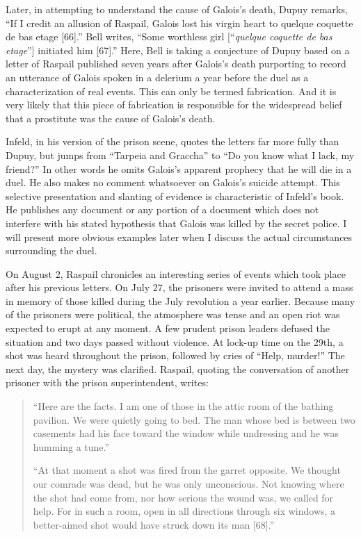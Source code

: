 \documentclass[12pt]{article}
\begin{document}
Later, in attempting to understand the cause of Galois's death, Dupuy remarks, ``If I credit an allusion of Raspail, Galois lost his virgin heart to quelque coquette de bas etage [66].'' Bell writes, ``Some worthless girl [``\emph{quelque coquette de bas etage}''] initiated him [67].'' Here, Bell is taking a conjecture of Dupuy based on a letter of Raspail published seven years after Galois's death purporting to record an utterance of Galois spoken in a delerium a year before the duel as a characterization of real events. This can only be termed fabrication. And it is very likely that this piece of fabrication is responsible for the widespread belief that a prostitute was the cause of Galois's death.

Infeld, in his version of the prison scene, quotes the letters far more fully than Dupuy, but jumps from ``Tarpeia and Graccha'' to ``Do you know what I lack, my friend?'' In other words he omits Galois's apparent prophecy that he will die in a duel. He also makes no comment whatsoever on Galois's suicide attempt. This selective presentation and slanting of evidence is characteristic of Infeld's book. He publishes any document or any portion of a document which does not interfere with his stated hypothesis that Galois was killed by the secret police. I will present more obvious examples later when I discuss the actual circumstances surrounding the duel.

On August 2, Raspail chronicles an interesting series of events which took place after his previous letters. On July 27, the prisoners were invited to attend a mass in memory of those killed during the July revolution a year earlier. Because many of the prisoners were political, the atmosphere was tense and an open riot was expected to erupt at any moment. A few prudent prison leaders defused the situation and two days passed without violence. At lock-up time on the 29th, a shot was heard throughout the prison, followed by cries of ``Help, murder!'' The next day, the mystery was clarified. Raspail, quoting the conversation of another prisoner with the prison superintendent, writes:

\begin{quotation}
``Here are the facts. I am one of those in the attic room of the bathing pavilion. We were quietly going to bed. The man whose bed is between two casements had his face toward the window while undressing and he was humming a tune.''

``At that moment a shot was fired from the garret opposite. We thought our comrade was dead, but he was only unconscious. Not knowing where the shot had come from, nor how serious the wound was, we called for help. For in such a room, open in all directions through six windows, a better-aimed shot would have struck down its man [68].''
\end{quotation}
\end{document}

